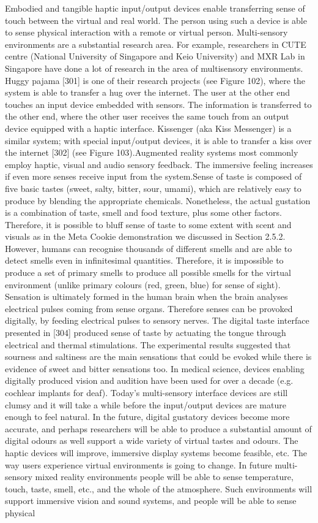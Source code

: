 Embodied and tangible haptic input/output devices enable transferring sense of touch between the virtual and real world. The person using such a device is able to sense physical interaction with a remote or virtual person. Multi-sensory environments are a substantial research area. For example, researchers in CUTE centre (National University of Singapore and Keio University) and MXR Lab in Singapore have done a lot of research in the area of multisensory environments. Huggy pajama [301] is one of their research projects (see Figure 102), where the system is able to transfer a hug over the internet. The user at the other end touches an input device embedded with sensors. The information is transferred to the other end, where the other user receives the same touch from an output device equipped with a haptic interface. Kissenger (aka Kiss Messenger) is a similar system; with special input/output devices, it is able to transfer a kiss over the internet [302] (see Figure 103).Augmented reality systems most commonly employ haptic, visual and audio sensory feedback. The immersive feeling increases if even more senses receive input from the system.Sense of taste is composed of five basic tastes (sweet, salty, bitter, sour, umami), which are relatively easy to produce by blending the appropriate chemicals. Nonetheless, the actual gustation is a combination of taste, smell and food texture, plus some other factors. Therefore, it is possible to bluff sense of taste to some extent with scent and visuals as in the Meta Cookie demonstration we discussed in Section 2.5.2. However, humans can recognise thousands of different smells and are able to detect smells even in infinitesimal quantities. Therefore, it is impossible to produce a set of primary smells to produce all possible smells for the virtual environment (unlike primary colours (red, green, blue) for sense of sight). Sensation is ultimately formed in the human brain when the brain analyses electrical pulses coming from sense organs. Therefore senses can be provoked digitally, by feeding electrical pulses to sensory nerves. The digital taste interface presented in [304] produced sense of taste by actuating the tongue through electrical and thermal stimulations. The experimental results suggested that sourness and saltiness are the main sensations that could be evoked while there is evidence of sweet and bitter sensations too. In medical science, devices enabling digitally produced vision and audition have been used for over a decade (e.g. cochlear implants for deaf). Today’s multi-sensory interface devices are still clumsy and it will take a while before the input/output devices are mature enough to feel natural. In the future, digital gustatory devices become more accurate, and perhaps researchers will be able to produce a substantial amount of digital odours as well support a wide variety of virtual tastes and odours. The haptic devices will improve, immersive display systems become feasible, etc. The way users experience virtual environments is going to change. In future multi-sensory mixed reality environments people will be able to sense temperature, touch, taste, smell, etc., and the whole of the atmosphere. Such environments will support immersive vision and sound systems, and people will be able to sense physical 